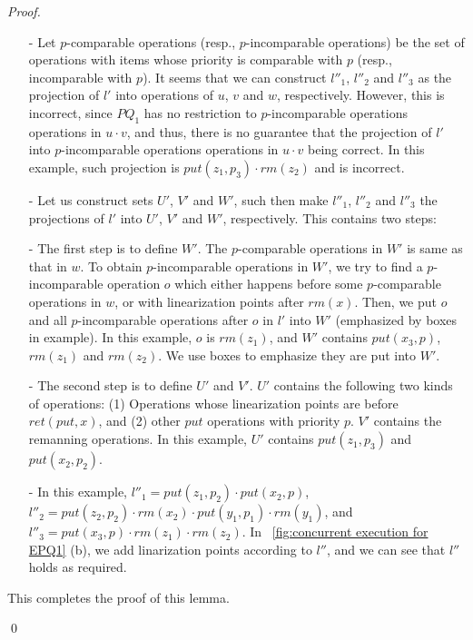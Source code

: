 \begin {proof}
\begin{itemize}
\setlength{\itemsep}{0.5pt}
\item[-] Let $p$-comparable operations (resp., $p$-incomparable operations) be the set of operations with items whose priority is comparable with $p$ (resp., incomparable with $p$). It seems that we can construct $l''_1$, $l''_2$ and $l''_3$ as the projection of $l'$ into operations of $u$, $v$ and $w$, respectively. However, this is incorrect, since $\textit{PQ}_1$ has no restriction to $p$-incomparable operations operations in $u \cdot v$, and thus, there is no guarantee that the projection of $l'$ into $p$-incomparable operations operations in $u \cdot v$ being correct. In this example, such projection is $\textit{put}(z_1,p_3) \cdot \textit{rm}(z_2)$ and is incorrect.

\item[-] Let us construct sets $U'$, $V'$ and $W'$, such then make $l''_1$, $l''_2$ and $l''_3$ the projections of $l'$ into $U'$, $V'$ and $W'$, respectively. This contains two steps:

\item[-] The first step is to define $W'$. The $p$-comparable operations in $W'$ is same as that in $w$. To obtain $p$-incomparable operations in $W'$, we try to find a $p$-incomparable operation $o$ which either happens before some $p$-comparable operations in $w$, or with linearization points after $\textit{rm}(x)$. Then, we put $o$ and all $p$-incomparable operations after $o$ in $l'$ into $W'$ (emphasized by boxes in example). In this example, $o$ is $\textit{rm}(z_1)$, and $W'$ contains $\textit{put}(x_3,p)$, $\textit{rm}(z_1)$ and $\textit{rm}(z_2)$. We use boxes to emphasize they are put into $W'$.

\item[-] The second step is to define $U'$ and $V'$. $U'$ contains the following two kinds of operations: (1) Operations whose linearization points are before $\textit{ret}(\textit{put},x)$, and (2) other $\textit{put}$ operations with priority $p$. $V'$ contains the remanning operations. In this example, $U'$ contains $\textit{put}(z_1,p_3)$ and $\textit{put}(x_2,p_2)$.

\item[-] In this example, $l''_1 = \textit{put}(z_1,p_2) \cdot \textit{put}(x_2,p)$, $l''_2 = \textit{put}(z_2,p_2) \cdot \textit{rm}(x_2) \cdot \textit{put}(y_1,p_1) \cdot \textit{rm}(y_1)$, and $l''_3 = \textit{put}(x_3,p) \cdot \textit{rm}(z_1) \cdot \textit{rm}(z_2)$. In \figurename~\ref{fig:concurrent execution for EPQ1} (b), we add linarization points according to $l''$, and we can see that $l''$ holds as required.
\end{itemize}

This completes the proof of this lemma. 


\qed
\end {proof}



